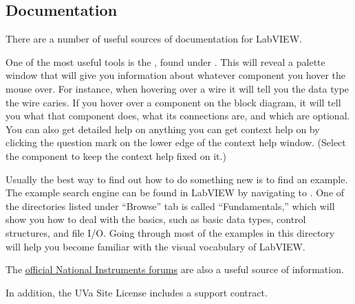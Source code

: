 \subsection{Documentation}
\label{sec:eq_labview:docs}

There are a number of useful sources of documentation for LabVIEW.

One of the most useful tools is the , found under .  This will reveal a palette window that will give you information about whatever component you hover the mouse over.  For instance, when hovering over a wire it will tell you the data type the wire caries.  If you hover over a component on the block diagram, it will tell you what that component does, what its connections are, and which are optional.  You can also get detailed help on anything you can get context help on by clicking the question mark on the lower edge of the context help window.  (Select the component to keep the context help fixed on it.)

Usually the best way to find out how to do something new is to find an example.  The example search engine can be found in LabVIEW by navigating to .  One of the directories listed under ``Browse'' tab is called ``Fundamentals,'' which will show you how to deal with the basics, such as basic data types, control structures, and file I/O.  Going through most of the examples in this directory will help you become familiar with the visual vocabulary of LabVIEW.

The \href{http://forums.ni.com/ni/}{official National Instruments forums} are also a useful source of information.

In addition, the UVa Site License includes a support contract.


